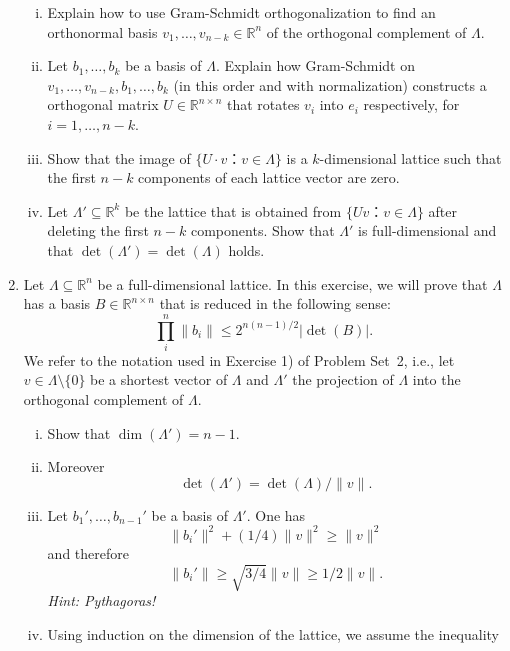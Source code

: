 \documentclass[11pt,a4paper]{article}
\begin{document}
\begin{enumerate}[1)]
  \begin{enumerate}[i)] 
  \item Explain how to use Gram-Schmidt orthogonalization to find an
    orthonormal basis $v_1,\dots,v_{n-k}∈ ℝ^n$ of the orthogonal
    complement of $Λ$.
  \item Let $b_1,\dots,b_k$ be a basis of $Λ$. Explain how
    Gram-Schmidt on $v_1,\dots,v_{n-k},b_1,\dots,b_k$ (in this order
    and with normalization) constructs a orthogonal matrix
    $U ∈ ℝ^{ n ×n}$ that rotates $v_i$ into $e_i$ respectively, for
    $i=1,\dots,n-k$.
  \item Show that the image of $\{ U ⋅v ： v ∈ Λ\}$ is a $k$-dimensional lattice such that the first $n-k$ components of each lattice vector are zero.
  \item Let $Λ' ⊆ ℝ^k$ be the lattice that is obtained from $\{ U v ： v ∈ Λ\}$ after deleting the first $n-k$ components. Show that $Λ'$ is full-dimensional and that $\det(Λ') = \det(Λ)$ holds. 
  \end{enumerate}
\item Let $Λ⊆ℝ^n$ be a full-dimensional lattice. In this exercise, we will prove that $Λ$ has a basis $B ∈ℝ^{n ×n}$  that is reduced in the following sense:
  \begin{displaymath}
   ∏_i^n \|b_i\| ≤ 2^{n (n-1)/2}  |\det (B)|.
 \end{displaymath}
 We refer to the notation used in Exercise 1) of Problem Set~2, i.e., let $v ∈Λ \setminus \{0\}$ be a shortest vector of $Λ$ and $Λ'$ the projection of $Λ$ into the orthogonal complement of $Λ$.
 \begin{enumerate}[i)]
 \item Show that $\dim(Λ') = n-1$.
 \item Moreover 
   \begin{displaymath}
     \det(Λ') = \det(Λ) / \|v\|.  
   \end{displaymath}
 \item Let $b_1', \dots , b_{n-1}'$ be a basis of $Λ'$. One has
   \begin{displaymath}
     \| b_i'\| ^2 + (1/4) \|v\|^2 ≥ \|v\|^2
   \end{displaymath}
   and therefore
   \begin{displaymath}
     \| b_i'\|   ≥ \sqrt{3/4}\|v\| ≥ 1/2 \|v\|. 
   \end{displaymath}
   \hfill{\emph{Hint: Pythagoras!}} 
 \item Using induction on the dimension of the lattice, we assume the inequality
   \begin{eqnarray*}

\end{eqnarray*}
\end{enumerate}
\end{enumerate}
\end{document}
